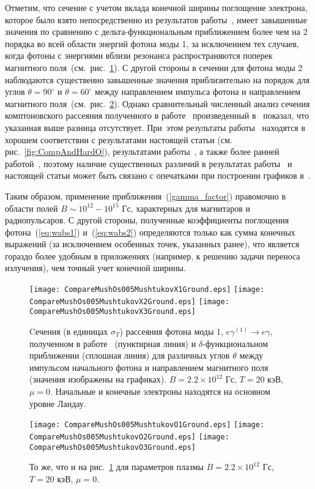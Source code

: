 Отметим, что сечение с учетом вклада конечной ширины поглощение электрона, которое было взято непосредственно из результатов работы~\cite{Mushtukov:2016}, имеет завышенные значения по сравнению с дельта-функциональным приближением более чем на 2 порядка во всей области энергий фотона моды 1, за исключением тех случаев, когда фотоны с энергиями вблизи резонанса распространяются поперек магнитного поля~(см.~рис.~\ref{fig:CompAndMushXGround}).  С другой стороны в сечении для фотона моды 2 наблюдаются существенно завышенные значения приблизительно на порядок для углов $\theta=90^\circ$ и $\theta=60^\circ$ между направлением импульса фотона и направлением магнитного поля~(см.~рис.~\ref{fig:CompAndMushO}). Однако сравнительный численный анализ сечения комптоновского рассеяния полученного в работе~\cite{Mushtukov:2016} произведенный в~\cite{SchwarmD:2017} показал, что указанная выше разница отсутствует. При~этом результаты работы~\cite{SchwarmD:2017} находятся в хорошем соответствии с результатами настоящей статьи (см. рис.~\ref{fig:CompAndHardO}), результатами работы~\cite{Harding:1986}, а также более ранней работой~\cite{Mushtukov:2015}, поэтому наличие существенных различий в результатах работы~\cite{Mushtukov:2016} и настоящей статьи может быть связано с опечатками при построении графиков в~\cite{Mushtukov:2016}.

Таким образом, применение 
приближения~(\ref{gamma_factor}) правомочно  в области полей $B \sim 10^{12}-10^{15}$ Гс, характерных для магнитаров и радиопульсаров. С другой стороны, полученные коэффициенты поглощения фотона~(\ref{eq:wabs1}) и~(\ref{eq:wabs2}) определяются только как сумма конечных выражений (за исключением особенных точек, указанных ранее), что является гораздо более удобным в приложениях (например, к решению задачи переноса излучения), чем точный учет конечной ширины.
\clearpage
\begin{figure}[t!]\centering
	\texttt{[image: CompareMushOs005MushtukovX1Ground.eps]}
	\texttt{[image: CompareMushOs005MushtukovX2Ground.eps]}
	\texttt{[image: CompareMushOs005MushtukovX3Ground.eps]}
	\caption{Cечения (в единицах $\sigma_T$) рассеяния фотона моды 1, $e\gamma^{(1)}  \to e\gamma$, полученном в работе~\cite{Mushtukov:2016} (пунктирная линия) и $\delta$-функциональном приближении (сплошная линия) для различных углов $\theta$ между импульсом начального фотона и направлением магнитного поля (значения изображены на графиках). $B=2.2\times 10^{12}$ Гс, $T = 20$ кэВ, $\mu=0$. Начальные и конечные электроны находятся на основном уровне Ландау.}
	\label{fig:CompAndMushXGround}
\end{figure}
\begin{figure}[t!]\centering
	\texttt{[image: CompareMushOs005MushtukovO1Ground.eps]}
	\texttt{[image: CompareMushOs005MushtukovO2Ground.eps]}
	\texttt{[image: CompareMushOs005MushtukovO3Ground.eps]}
	\caption{То же, что и на рис.~\ref{fig:CompAndMushXGround} для параметров плазмы $B=2.2\times 10^{12}$ Гс, $T = 20$ кэВ, $\mu=0$.}
	\label{fig:CompAndMushO}
\end{figure}
\clearpage



